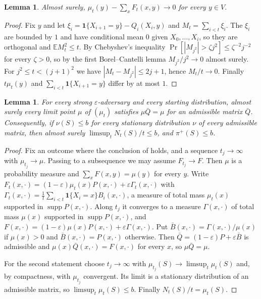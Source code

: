 \documentclass[11pt]{article}
\newtheorem{lemma}[theorem]{Lemma}
\theoremstyle{remark}
\theoremstyle{plain}
\DeclareMathOperator{\supp}{supp}
\begin{document}
\begin{lemma}\label{lem:emp}
Almost surely, $\mu_t(y)-\sum_xF_t(x,y)\to0$ for every $y\in V$.
\end{lemma}

\begin{proof}
Fix $y$ and let $\xi_i=\mathbf1\{X_{i+1}=y\}-Q_i(X_i,y)$ and $M_t=\sum_{i<t}\xi_i$. The $\xi_i$ are bounded by $1$
and have conditional mean $0$ given $X_0,\dots,X_i$, so they are orthogonal and $\mathbb E M_t^2\le t$. By
Chebyshev's inequality $\Pr[|M_{j^2}|>\zeta j^2]\le\zeta^{-2}j^{-2}$ for every $\zeta>0$, so by the first
Borel--Cantelli lemma $M_{j^2}/j^2\to0$ almost surely. For $j^2\le t<(j+1)^2$ we have $|M_t-M_{j^2}|\le2j+1$, hence
$M_t/t\to0$. Finally $t\mu_t(y)$ and $\sum_{i<t}\mathbf1\{X_{i+1}=y\}$ differ by at most $1$.
\end{proof}

\begin{lemma}\label{lem:limit}
For every strong $\varepsilon$-adversary and every starting distribution, almost surely every limit point $\mu$ of
$(\mu_t)$ satisfies $\mu\bar Q=\mu$ for an admissible matrix $\bar Q$. Consequently, if $\nu(S)\le b$ for every
stationary distribution $\nu$ of every admissible matrix, then almost surely $\limsup_tN_t(S)/t\le b$, and
$\pi^+(S)\le b$.
\end{lemma}

\begin{proof}
Fix an outcome where the conclusion of  holds, and a sequence $t_j\to\infty$ with $\mu_{t_j}\to\mu$.
Passing to a subsequence we may assume $F_{t_j}\to F$. Then $\mu$ is a probability measure and
$\sum_xF(x,y)=\mu(y)$ for every $y$. Write $F_t(x,\cdot)=(1-\varepsilon)\mu_t(x)P(x,\cdot)+\varepsilon\Gamma_t(x,\cdot)$
with $\Gamma_t(x,\cdot)=\frac1t\sum_{i<t}\mathbf1\{X_i=x\}B_i(x,\cdot)$, a measure of total mass $\mu_t(x)$ supported
in $\supp P(x,\cdot)$. Along $t_j$ it converges to a measure $\Gamma(x,\cdot)$ of total mass $\mu(x)$ supported in
$\supp P(x,\cdot)$, and $F(x,\cdot)=(1-\varepsilon)\mu(x)P(x,\cdot)+\varepsilon\Gamma(x,\cdot)$. Put
$\bar B(x,\cdot)=\Gamma(x,\cdot)/\mu(x)$ if $\mu(x)>0$ and $\bar B(x,\cdot)=P(x,\cdot)$ otherwise. Then
$\bar Q=(1-\varepsilon)P+\varepsilon\bar B$ is admissible and $\mu(x)\bar Q(x,\cdot)=F(x,\cdot)$ for every $x$, so
$\mu\bar Q=\mu$.

For the second statement choose $t_j\to\infty$ with $\mu_{t_j}(S)\to\limsup_t\mu_t(S)$ and, by compactness, with
$\mu_{t_j}$ convergent. Its limit is a stationary distribution of an admissible matrix, so
$\limsup_t\mu_t(S)\le b$. Finally $N_t(S)/t=\mu_t(S)$.
\end{proof}
\end{document}
